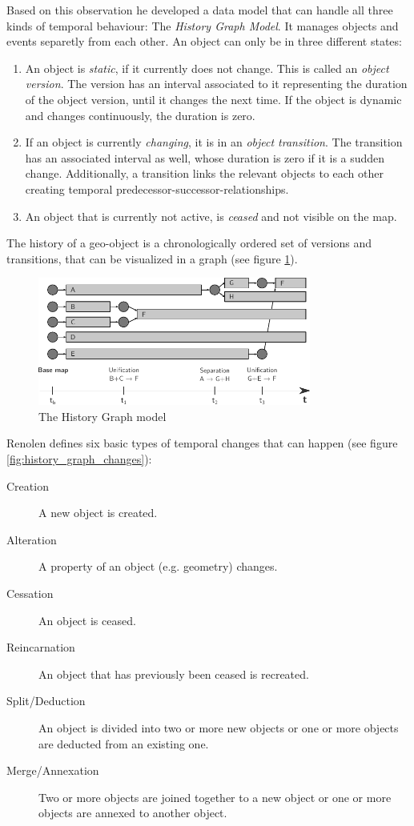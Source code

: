 Based on this observation he developed a data model that can handle all three kinds of temporal behaviour: The \emph{History Graph Model}. It manages objects and events separetly from each other. An object can only be in three different states:
\begin{enumerate}
  \item An object is \emph{static}, if it currently does not change. This is called an \emph{object version}. The version has an interval associated to it representing the duration of the object version, until it changes the next time. If the object is dynamic and changes continuously, the duration is zero.
  \item If an object is currently \emph{changing}, it is in an \emph{object transition}. The transition has an associated interval as well, whose duration is zero if it is a sudden change. Additionally, a transition links the relevant objects to each other creating temporal predecessor-successor-relationships.
  \item An object that is currently not active, is \emph{ceased} and not visible on the map.
\end{enumerate}

The history of a geo-object is a chronologically ordered set of versions and transitions, that can be visualized in a graph (see figure \ref{fig:history_graph_model}).

\begin{figure}[ht]
  \centering
  \includegraphics[width=0.8\textwidth]{graphics/basics/stdm/history_graph_model}
  \caption{The History Graph model}
  \label{fig:history_graph_model}
\end{figure}

Renolen defines six basic types of temporal changes that can happen (see figure \ref{fig:history_graph_changes}):
\begin{description}
  \item[Creation]           A new object is created.
  \item[Alteration]         A property of an object (e.g. geometry) changes.
  \item[Cessation]          An object is ceased.
  \item[Reincarnation]      An object that has previously been ceased is recreated.
  \item[Split/Deduction]    An object is divided into two or more new objects or one or more objects are deducted from an existing one.
  \item[Merge/Annexation]   Two or more objects are joined together to a new object or one or more objects are annexed to another object.
\end{description}

